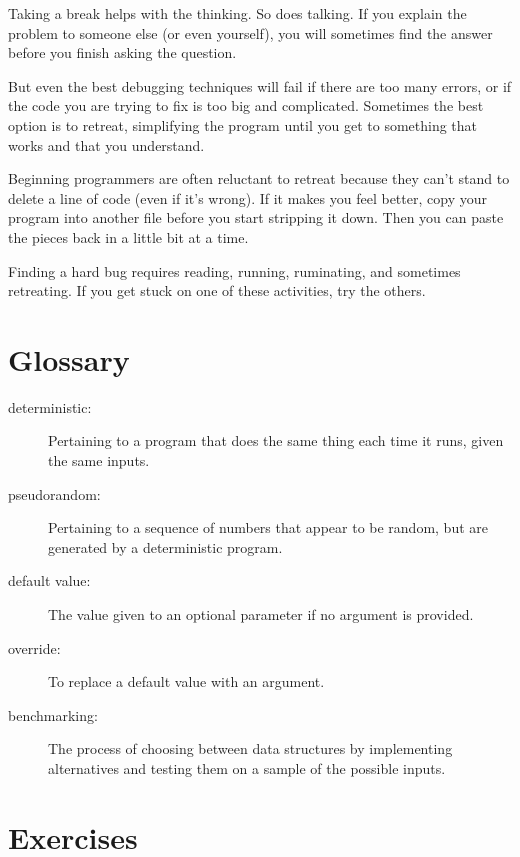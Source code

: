 \documentclass[10pt]{book}
\begin{document}
{Taking a break helps with the thinking.  So does talking.
If you explain the problem to someone else (or even yourself), you
will sometimes find the answer before you finish asking the question.

But even the best debugging techniques will fail if there are too many
errors, or if the code you are trying to fix is too big and
complicated.  Sometimes the best option is to retreat, simplifying the
program until you get to something that works and that you
understand.

Beginning programmers are often reluctant to retreat because
they can't stand to delete a line of code (even if it's wrong).
If it makes you feel better, copy your program into another file
before you start stripping it down.  Then you can paste the pieces
back in a little bit at a time.

Finding a hard bug requires reading, running, ruminating, and
sometimes retreating.  If you get stuck on one of these activities,
try the others.


\section{Glossary}

\begin{description}

\item[deterministic:] Pertaining to a program that does the same
thing each time it runs, given the same inputs.

\item[pseudorandom:] Pertaining to a sequence of numbers that appear
to be random, but are generated by a deterministic program.

\item[default value:] The value given to an optional parameter if no
argument is provided.

\item[override:] To replace a default value with an argument.

\item[benchmarking:] The process of choosing between data structures
by implementing alternatives and testing them on a sample of the
possible inputs.  

\end{description}


\section{Exercises}

}
\end{document}

